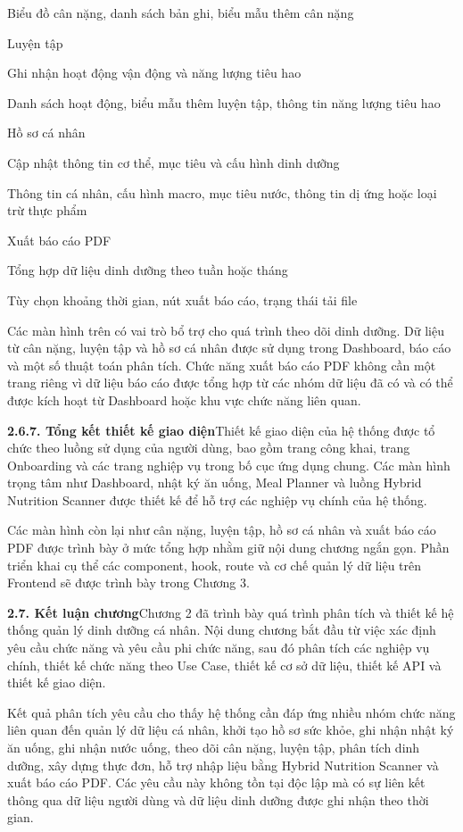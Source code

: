Biểu đồ cân nặng, danh sách bản ghi, biểu mẫu thêm cân nặng

Luyện tập

Ghi nhận hoạt động vận động và năng lượng tiêu hao

Danh sách hoạt động, biểu mẫu thêm luyện tập, thông tin năng lượng tiêu hao

Hồ sơ cá nhân

Cập nhật thông tin cơ thể, mục tiêu và cấu hình dinh dưỡng

Thông tin cá nhân, cấu hình macro, mục tiêu nước, thông tin dị ứng hoặc loại trừ thực phẩm

Xuất báo cáo PDF

Tổng hợp dữ liệu dinh dưỡng theo tuần hoặc tháng

Tùy chọn khoảng thời gian, nút xuất báo cáo, trạng thái tải file

Các màn hình trên có vai trò bổ trợ cho quá trình theo dõi dinh dưỡng. Dữ liệu từ cân nặng, luyện tập và hồ sơ cá nhân được sử dụng trong Dashboard, báo cáo và một số thuật toán phân tích. Chức năng xuất báo cáo PDF không cần một trang riêng vì dữ liệu báo cáo được tổng hợp từ các nhóm dữ liệu đã có và có thể được kích hoạt từ Dashboard hoặc khu vực chức năng liên quan.

\textbf{2.6.7. Tổng kết thiết kế giao diện}Thiết kế giao diện của hệ thống được tổ chức theo luồng sử dụng của người dùng, bao gồm trang công khai, trang Onboarding và các trang nghiệp vụ trong bố cục ứng dụng chung. Các màn hình trọng tâm như Dashboard, nhật ký ăn uống, Meal Planner và luồng Hybrid Nutrition Scanner được thiết kế để hỗ trợ các nghiệp vụ chính của hệ thống.

Các màn hình còn lại như cân nặng, luyện tập, hồ sơ cá nhân và xuất báo cáo PDF được trình bày ở mức tổng hợp nhằm giữ nội dung chương ngắn gọn. Phần triển khai cụ thể các component, hook, route và cơ chế quản lý dữ liệu trên Frontend sẽ được trình bày trong Chương 3.

\textbf{2.7. Kết luận chương}Chương 2 đã trình bày quá trình phân tích và thiết kế hệ thống quản lý dinh dưỡng cá nhân. Nội dung chương bắt đầu từ việc xác định yêu cầu chức năng và yêu cầu phi chức năng, sau đó phân tích các nghiệp vụ chính, thiết kế chức năng theo Use Case, thiết kế cơ sở dữ liệu, thiết kế API và thiết kế giao diện.

Kết quả phân tích yêu cầu cho thấy hệ thống cần đáp ứng nhiều nhóm chức năng liên quan đến quản lý dữ liệu cá nhân, khởi tạo hồ sơ sức khỏe, ghi nhận nhật ký ăn uống, ghi nhận nước uống, theo dõi cân nặng, luyện tập, phân tích dinh dưỡng, xây dựng thực đơn, hỗ trợ nhập liệu bằng Hybrid Nutrition Scanner và xuất báo cáo PDF. Các yêu cầu này không tồn tại độc lập mà có sự liên kết thông qua dữ liệu người dùng và dữ liệu dinh dưỡng được ghi nhận theo thời gian.

